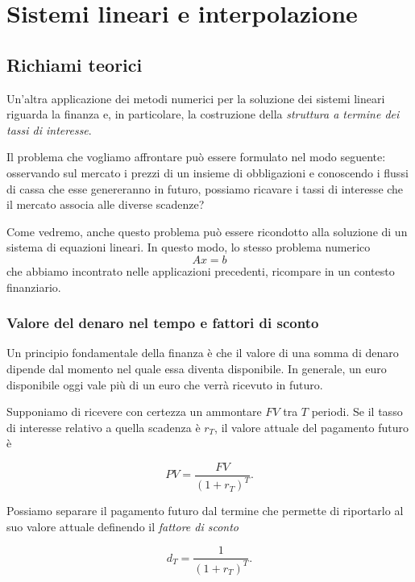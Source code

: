 
\chapter{Sistemi lineari e interpolazione}
\newpage
\minitoc
\newpage

\section{Richiami teorici}
\label{sec:term-structure}

Un'altra applicazione dei metodi numerici per la soluzione dei
sistemi lineari riguarda la finanza e, in particolare, la
costruzione della \emph{struttura a termine dei tassi di interesse}.

Il problema che vogliamo affrontare può essere formulato nel modo
seguente: osservando sul mercato i prezzi di un insieme di
obbligazioni e conoscendo i flussi di cassa che esse genereranno
in futuro, possiamo ricavare i tassi di interesse che il mercato
associa alle diverse scadenze?

Come vedremo, anche questo problema può essere ricondotto alla
soluzione di un sistema di equazioni lineari. In questo modo,
lo stesso problema numerico
$$Ax=b$$
che abbiamo incontrato nelle applicazioni precedenti, ricompare in un contesto finanziario.


\subsection{Valore del denaro nel tempo e fattori di sconto}

Un principio fondamentale della finanza è che il valore di una
somma di denaro dipende dal momento nel quale essa diventa
disponibile. In generale, un euro disponibile oggi vale più di un
euro che verrà ricevuto in futuro.

Supponiamo di ricevere con certezza un ammontare $FV$ tra 
$T$ periodi. Se il tasso di interesse relativo a quella scadenza è $r_T$,
il valore attuale del pagamento futuro è

\begin{equation}
    PV=
    \frac{FV}{(1+r_T)^T}.
    \label{eq:present-value-term}
\end{equation}

Possiamo separare il pagamento futuro dal termine che permette
di riportarlo al suo valore attuale definendo il
\emph{fattore di sconto}

\begin{equation*}
    d_T=
    \frac{1}{(1+r_T)^T}.
    \label{eq:discount-factor}
\end{equation*}

